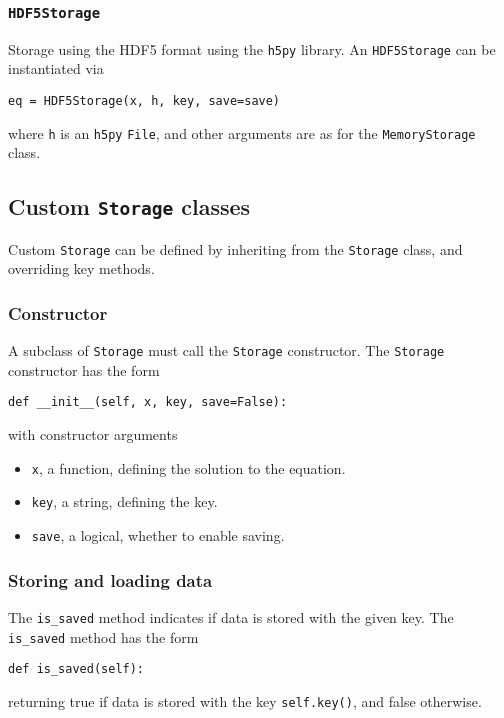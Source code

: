 \documentclass[11pt]{article}
\begin{document}
\subsubsection{\texttt{HDF5Storage}}

Storage using the HDF5 format \citep{hdf52021} using the \texttt{h5py} library.
An \texttt{HDF5Storage} can be instantiated via
\begin{lstlisting}
eq = HDF5Storage(x, h, key, save=save)
\end{lstlisting}
where \texttt{h} is an \texttt{h5py} \texttt{File}, and other arguments are as
for the \texttt{MemoryStorage} class.

\subsection{Custom \texttt{Storage} classes}

Custom \texttt{Storage} can be defined by inheriting from the \texttt{Storage}
class, and overriding key methods.

\subsubsection{Constructor}

A subclass of \texttt{Storage} must call the \texttt{Storage} constructor. The
\texttt{Storage} constructor has the form
\begin{lstlisting}
def __init__(self, x, key, save=False):
\end{lstlisting}
with constructor arguments
\begin{itemize}
  \item \texttt{x}, a function, defining the solution to the equation.
  \item \texttt{key}, a string, defining the key.
  \item \texttt{save}, a logical, whether to enable saving.
\end{itemize}

\subsubsection{Storing and loading data}

The \texttt{is\_saved} method indicates if data is stored with the given key.
The \texttt{is\_saved} method has the form
\begin{lstlisting}
def is_saved(self):
\end{lstlisting}
returning true if data is stored with the key \texttt{self.key()}, and false
otherwise.
\end{document}
